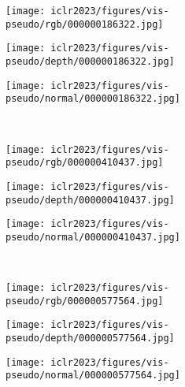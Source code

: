 \documentclass{article} \usepackage{iclr2023_conference,times}
\begin{document}
\begin{figure}
     \centering

     \begin{subfigure}[b]{0.32\textwidth}
         \centering
         \texttt{[image: iclr2023/figures/vis-pseudo/rgb/000000186322.jpg]}
\label{fig:three sin x}
     \end{subfigure}
     \begin{subfigure}[b]{0.32\textwidth}
         \centering
         \texttt{[image: iclr2023/figures/vis-pseudo/depth/000000186322.jpg]}
\label{fig:five over x}
     \end{subfigure} 
     \begin{subfigure}[b]{0.32\textwidth}
         \centering
         \texttt{[image: iclr2023/figures/vis-pseudo/normal/000000186322.jpg]}
\label{fig:y equals x}
     \end{subfigure}
     \\
\begin{subfigure}[b]{0.32\textwidth}
         \centering
         \texttt{[image: iclr2023/figures/vis-pseudo/rgb/000000410437.jpg]}
\label{fig:three sin x}
     \end{subfigure}
     \begin{subfigure}[b]{0.32\textwidth}
         \centering
         \texttt{[image: iclr2023/figures/vis-pseudo/depth/000000410437.jpg]}
\label{fig:five over x}
     \end{subfigure} 
     \begin{subfigure}[b]{0.32\textwidth}
         \centering
         \texttt{[image: iclr2023/figures/vis-pseudo/normal/000000410437.jpg]}
\label{fig:y equals x}
     \end{subfigure}
     \\
     \begin{subfigure}[b]{0.32\textwidth}
         \centering
         \texttt{[image: iclr2023/figures/vis-pseudo/rgb/000000577564.jpg]}
\label{fig:three sin x}
     \end{subfigure}
     \begin{subfigure}[b]{0.32\textwidth}
         \centering
         \texttt{[image: iclr2023/figures/vis-pseudo/depth/000000577564.jpg]}
\label{fig:five over x}
     \end{subfigure} 
     \begin{subfigure}[b]{0.32\textwidth}
         \centering
         \texttt{[image: iclr2023/figures/vis-pseudo/normal/000000577564.jpg]}

\end{subfigure}
\end{figure}
\end{document}
